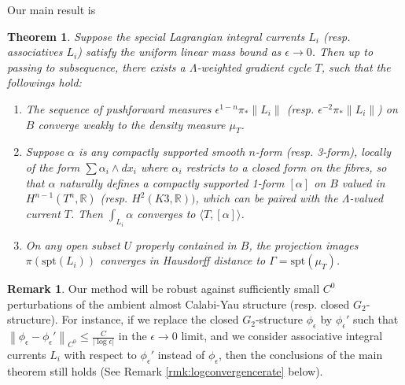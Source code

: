 \documentclass{article}
\newtheorem{thm}{Theorem}[section]
\theoremstyle{definition}
\newtheorem{rmk}{Remark}
\newcommand{\R}{\mathbb{R}}
\newcommand{\norm}[1]{\left\lVert#1\right\rVert}
\begin{document}
		
		
		
		
		
		Our main result is 
		
		
		\begin{thm}\label{mainthm}
		Suppose the special Lagrangian integral currents $L_i$ (resp. associatives $L_i$) satisfy the uniform linear mass bound as $\epsilon\to 0$. Then up to passing to subsequence, there exists a $\Lambda$-weighted gradient cycle $T$, such that the followings hold:
		\begin{enumerate}
			\item  The sequence of pushforward measures $\epsilon^{1-n}\pi_* \norm{L_i} $ (resp. $\epsilon^{-2}   \pi_* \norm{L_i} $)    on $B$ converge weakly to the density measure $\mu_T$.
			
			
			\item  Suppose $\alpha$ is any compactly supported smooth $n$-form (resp. 3-form), locally of the form $\sum  \alpha_i \wedge dx_i$ where $\alpha_i$ restricts to a closed form on the fibres, so that $\alpha$ naturally defines a compactly supported 1-form $[\alpha]$ on $B$ valued in $H^{n-1}(T^n,\R)$ (resp. $H^2(K3,\R))$, which can be paired with the $\Lambda$-valued current $T$. Then $\int_{L_i}\alpha$ converges to $\langle T, [\alpha] \rangle $.
			
			
			\item On any open subset $U$ properly contained in $B$, the projection images $\pi(\text{spt}(L_i)) $ converges in Hausdorff distance  to $\Gamma= \text{spt}(\mu_T)$.
			
		\end{enumerate}
		\end{thm}
		
		
		
		
		
		
	\begin{rmk}
		Our method will be robust against sufficiently small $C^0$ perturbations of the ambient almost Calabi-Yau structure (resp. closed $G_2$-structure). For instance, if we replace the closed $G_2$-structure $\phi_\epsilon$ by $\phi_\epsilon'$ such that $\norm{ \phi_\epsilon-\phi_\epsilon'}_{C^0}\leq \frac{C}{|\log \epsilon|}$ in the $\epsilon\to 0$ limit, and we consider associative integral currents $L_i$ with respect to $\phi_\epsilon'$ instead of $\phi_\epsilon$, then the conclusions of the main theorem still holds (See Remark \ref{rmk:logconvergencerate} below).
	\end{rmk}
		
		
	
\end{document}
